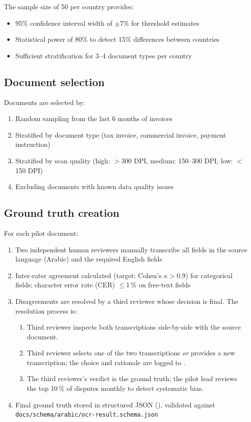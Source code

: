 \documentclass[11pt,a4paper,twoside]{report}
\begin{document}
The sample size of 50 per country provides:
\begin{itemize}
\item 95\% confidence interval width of $\pm$7\% for threshold estimates
\item Statistical power of 80\% to detect 15\% differences between countries
\item Sufficient stratification for 3--4 document types per country
\end{itemize}

\subsection{Document selection}

Documents are selected by:
\begin{enumerate}
\item Random sampling from the last 6 months of invoices
\item Stratified by document type (tax invoice, commercial invoice, payment
instruction)
\item Stratified by scan quality (high: $>$300 DPI, medium: 150--300 DPI,
low: $<$150 DPI)
\item Excluding documents with known data quality issues
\end{enumerate}

\subsection{Ground truth creation}

For each pilot document:
\begin{enumerate}
\item Two independent human reviewers manually transcribe all fields
in the source language (Arabic) and the required English fields
\item Inter-rater agreement calculated (target: Cohen's $\kappa > 0.9$)
for categorical fields; character error rate (CER) $\le$1\,\%
on free-text fields
\item Disagreements are resolved by a third reviewer whose decision is
final. The resolution process is:
\begin{enumerate}
\item Third reviewer inspects both transcriptions side-by-side
with the source document.
\item Third reviewer selects one of the two transcriptions
\emph{or} provides a new transcription; the choice and
rationale are logged to
.
\item The third reviewer's verdict is the ground truth; the
pilot lead reviews the top 10\,\% of disputes monthly
to detect systematic bias.
\end{enumerate}
\item Final ground truth stored in structured JSON
(), validated
against \texttt{docs/schema/arabic/ocr-result.schema.json}
\end{enumerate}
\end{document}
